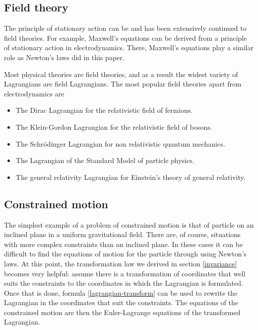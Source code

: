 \documentclass[prb,preprint]{revtex4-1}
\begin{document}
\subsection{Field theory \cite{Sterman,Dirac}} \label{field.theory}
The principle of stationary action can be and has been extensively continued to field theories. For example, Maxwell's equations can be derived from a principle of stationary action in electrodynamics. There, Maxwell's equations play a similar role as Newton's laws did in this paper.

Most physical theories are field theories, and as a result the widest variety of Lagrangians are field Lagrangians. The most popular field theories apart from electrodynamics are
\begin{itemize}
  \item The Dirac Lagrangian for the relativistic field of fermions.
  \item The Klein-Gordon Lagrangian for the relativistic field of bosons.
  \item The Schr{\"o}dinger Lagrangian for non relativistic quantum mechanics.
  \item The Lagrangian of the Standard Model of particle physics.
  \item The general relativity Lagrangian for Einstein's theory of general relativity.
\end{itemize}


\subsection{Constrained motion \cite{Kuypers}}
The simplest example of a problem of constrained motion is that of particle on an inclined plane in a uniform gravitational field. There are, of course, situations with more complex constraints than an inclined plane. In these cases it can be difficult to find the equations of motion for the particle through using Newton's laws. At this point, the transformation law we derived in section \ref{invariance} becomes very helpful: assume there is a transformation of coordinates that well suits the constraints to the coordinates in which the Lagrangian is formulated. Once that is done, formula \eqref{lagrangian-transform} can be used to rewrite the Lagrangian in the coordinates that suit the constraints. The equations of the constrained motion are then the Euler-Lagrange equations of the transformed Lagrangian.

\end{document}
